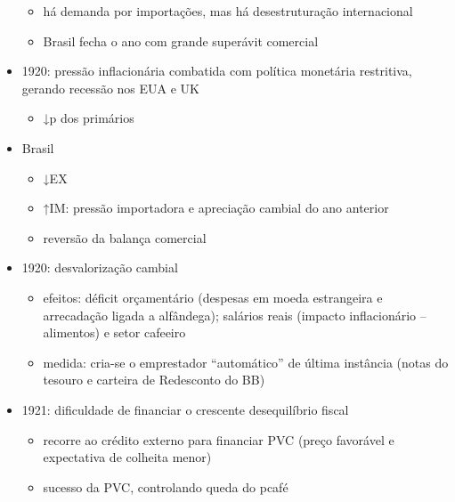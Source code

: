 \documentclass[a4paper,12pt]{article}[abntex2]
\begin{document}
\begin{itemize}
\begin{itemize}
    \item  há demanda por importações, mas há desestruturação internacional
\end{itemize}
\begin{itemize}
    \item  Brasil fecha o ano com grande superávit comercial
\end{itemize}
\item 1920: pressão inflacionária combatida com política monetária restritiva, gerando recessão nos EUA e UK
\begin{itemize}
    \item ↓p dos primários
\end{itemize}
\item Brasil
\begin{itemize}
    \item ↓EX
\end{itemize}
\begin{itemize}
    \item  ↑IM: pressão importadora e apreciação cambial do ano anterior
\end{itemize}
\begin{itemize}
    \item reversão da balança comercial
\end{itemize}
\item 1920: desvalorização cambial
\begin{itemize}
    \item efeitos: déficit orçamentário (despesas em moeda estrangeira e arrecadação ligada a alfândega); salários reais (impacto inflacionário – alimentos) e setor cafeeiro
\end{itemize}
\begin{itemize}
    \item  medida: cria-se o emprestador “automático” de última instância (notas do tesouro e carteira de Redesconto do BB)
\end{itemize}
\item 1921: dificuldade de financiar o crescente
desequilíbrio fiscal
\begin{itemize}
    \item recorre ao crédito externo para financiar PVC (preço favorável e expectativa de colheita menor)
\end{itemize}
\begin{itemize}
    \item  sucesso da PVC, controlando queda do pcafé
\end{itemize}

\end{itemize}
\end{document}
